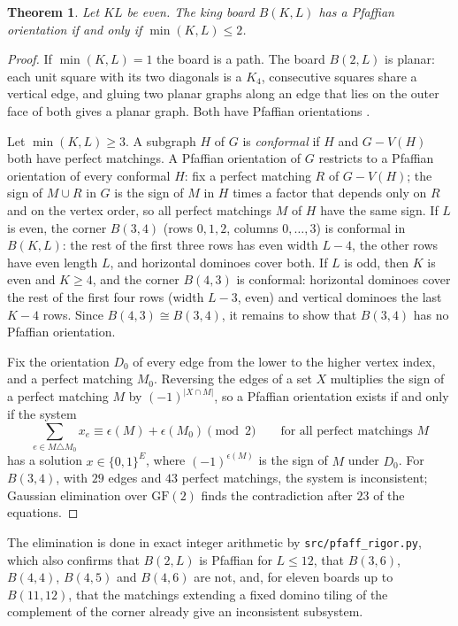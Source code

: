 \documentclass[11pt]{amsart}
\newtheorem{theorem}{Theorem}[section]
\theoremstyle{definition}
\theoremstyle{remark}
\newcommand{\file}[1]{\texttt{#1}}
\begin{document}
\begin{theorem}\label{thm:pfaff}
Let $KL$ be even. The king board $B(K, L)$ has a Pfaffian orientation if and only if
$\min(K, L) \le 2$.
\end{theorem}
\begin{proof}
If $\min(K, L) = 1$ the board is a path. The board $B(2, L)$ is planar: each unit square with
its two diagonals is a $K_4$, consecutive squares share a vertical edge, and gluing two planar
graphs along an edge that lies on the outer face of both gives a planar graph. Both have
Pfaffian orientations \cite[Thm.~8.3.4]{lovaszplummer1986}.

Let $\min(K, L) \ge 3$. A subgraph $H$ of $G$ is \emph{conformal} if $H$ and $G - V(H)$ both have
perfect matchings. A Pfaffian orientation of $G$ restricts to a Pfaffian orientation of every
conformal $H$: fix a perfect matching $R$ of $G - V(H)$; the sign of $M \cup R$ in $G$ is the sign
of $M$ in $H$ times a factor that depends only on $R$ and on the vertex order, so all perfect
matchings $M$ of $H$ have the same sign. If $L$ is even, the corner $B(3, 4)$ (rows $0, 1, 2$,
columns $0, \dots, 3$) is conformal in $B(K, L)$: the rest of the first three rows has even width
$L - 4$, the other rows have even length $L$, and horizontal dominoes cover both. If $L$ is odd,
then $K$ is even and $K \ge 4$, and the corner $B(4, 3)$ is conformal: horizontal dominoes cover
the rest of the first four rows (width $L - 3$, even) and vertical dominoes the last $K - 4$
rows. Since $B(4, 3) \cong B(3, 4)$, it remains to show that $B(3, 4)$ has no Pfaffian
orientation.

Fix the orientation $D_0$ of every edge from the lower to the higher vertex index, and a perfect
matching $M_0$. Reversing the edges of a set $X$ multiplies the sign of a perfect matching $M$ by
$(-1)^{|X \cap M|}$, so a Pfaffian orientation exists if and only if the system
\[
  \sum_{e \in M \triangle M_0} x_e \equiv \epsilon(M) + \epsilon(M_0) \pmod 2
  \qquad \text{for all perfect matchings } M
\]
has a solution $x \in \{0, 1\}^E$, where $(-1)^{\epsilon(M)}$ is the sign of $M$ under $D_0$. For
$B(3, 4)$, with $29$ edges and $43$ perfect matchings, the system is inconsistent; Gaussian
elimination over $\mathrm{GF}(2)$ finds the contradiction after $23$ of the equations.
\end{proof}

The elimination is done in exact integer arithmetic by \file{src/pfaff\_rigor.py}, which also
confirms that $B(2, L)$ is Pfaffian for $L \le 12$, that $B(3, 6)$, $B(4, 4)$, $B(4, 5)$ and
$B(4, 6)$ are not, and, for eleven boards up to $B(11, 12)$, that the matchings extending a fixed
domino tiling of the complement of the corner already give an inconsistent subsystem.
\end{document}
